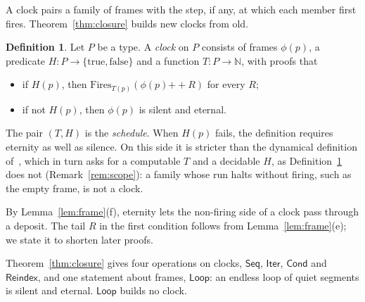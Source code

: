 \documentclass[11pt]{amsart}
\theoremstyle{definition}
\newtheorem{definition}[theorem]{Definition}
\newcommand{\app}{\mathbin{+\!\!+}}
\newcommand{\Fires}{\mathrm{Fires}}
\newcommand{\Seq}{\mathsf{Seq}}
\newcommand{\Iter}{\mathsf{Iter}}
\newcommand{\Loop}{\mathsf{Loop}}
\newcommand{\Cond}{\mathsf{Cond}}
\newcommand{\Reindex}{\mathsf{Reindex}}
\begin{document}
A clock pairs a family of frames with the step, if any, at which each member first fires.
Theorem~\ref{thm:closure} builds new clocks from old.

\begin{definition}\label{def:clock}
Let $P$ be a type. A \emph{clock} on $P$ consists of frames $\phi(p)$, a predicate $H\colon P\to
\{\mathrm{true},\mathrm{false}\}$ and a function $T\colon P\to\mathbb N$, with proofs that
\begin{itemize}
\item if $H(p)$, then $\Fires_{T(p)}(\phi(p)\app R)$ for every $R$;
\item if not $H(p)$, then $\phi(p)$ is silent and eternal.
\end{itemize}
\end{definition}

The pair $(T,H)$ is the \emph{schedule}. When $H(p)$ fails, the definition requires eternity as
well as silence. On this side it is stricter than the dynamical definition of~\citep{clocknote},
which in turn asks for a computable $T$ and a decidable $H$, as Definition~\ref{def:clock} does not
(Remark~\ref{rem:scope}): a family whose run halts without firing, such as the empty frame, is not
a clock.

By Lemma~\ref{lem:frame}(f), eternity lets the non-firing side of a clock pass through a deposit.
The tail $R$ in the first condition follows from Lemma~\ref{lem:frame}(e); we state it to shorten later
proofs.

Theorem~\ref{thm:closure} gives four operations on clocks, $\Seq$, $\Iter$, $\Cond$ and
$\Reindex$, and one statement about frames, $\Loop$: an endless loop of quiet segments is silent
and eternal. $\Loop$ builds no clock.
\end{document}
